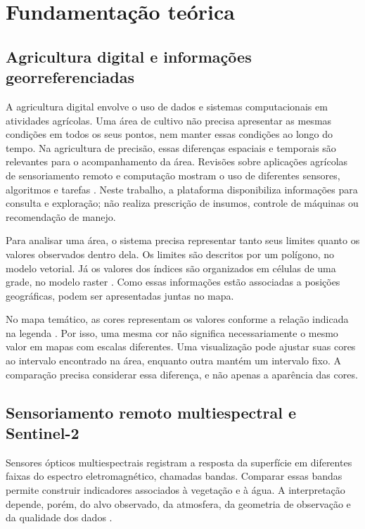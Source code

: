 \newpage
\section{Fundamentação teórica}\label{chap:fundamentacao-final}

\subsection{Agricultura digital e informações georreferenciadas}

A agricultura digital envolve o uso de dados e sistemas computacionais em atividades agrícolas. Uma área de cultivo não precisa apresentar as mesmas condições em todos os seus pontos, nem manter essas condições ao longo do tempo. Na agricultura de precisão, essas diferenças espaciais e temporais são relevantes para o acompanhamento da área. Revisões sobre aplicações agrícolas de sensoriamento remoto e computação mostram o uso de diferentes sensores, algoritmos e tarefas \citep{WEISS2020,PATRICIO2018}. Neste trabalho, a plataforma disponibiliza informações para consulta e exploração; não realiza prescrição de insumos, controle de máquinas ou recomendação de manejo.

Para analisar uma área, o sistema precisa representar tanto seus limites quanto os valores observados dentro dela. Os limites são descritos por um polígono, no modelo vetorial. Já os valores dos índices são organizados em células de uma grade, no modelo raster \citep{QGIS_VECTOR,QGIS_RASTER}. Como essas informações estão associadas a posições geográficas, podem ser apresentadas juntas no mapa.

No mapa temático, as cores representam os valores conforme a relação indicada na legenda \citep{QGIS_MAP}. Por isso, uma mesma cor não significa necessariamente o mesmo valor em mapas com escalas diferentes. Uma visualização pode ajustar suas cores ao intervalo encontrado na área, enquanto outra mantém um intervalo fixo. A comparação precisa considerar essa diferença, e não apenas a aparência das cores.

\subsection{Sensoriamento remoto multiespectral e Sentinel-2}

Sensores ópticos multiespectrais registram a resposta da superfície em diferentes faixas do espectro eletromagnético, chamadas bandas. Comparar essas bandas permite construir indicadores associados à vegetação e à água. A interpretação depende, porém, do alvo observado, da atmosfera, da geometria de observação e da qualidade dos dados \citep{WEISS2020}.

